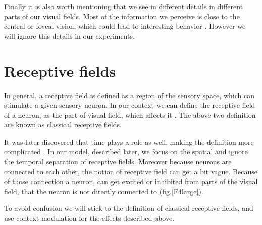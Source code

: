 Finally it is also worth mentioning that we see in different details in different parts of our visual fields. Most of the information we perceive is close to the central or foveal vision, which could lead to interesting behavior \cite{knight2008drastically}. However we will ignore this details in our experiments.


\section{Receptive fields}

In general, a receptive field is defined as a region of the sensory space, which can stimulate a given sensory neuron. In our context we can define the receptive field of a neuron, as the part of visual field, which affects it \cite{Hartline700}. The above two definition are known as classical receptive fields.

It was later discovered that time plays a role as well, making the definition more complicated \cite{deangelis1995receptive}. In our model, described later, we focus on the spatial and ignore the temporal separation of receptive fields. Moreover because neurons are connected to each other, the notion of receptive field can get a bit vague. Because of those connection a neuron, can get excited or inhibited from parts of the visual field, that the neuron is not directly connected to (fig.\ref{F4large}).

To avoid confusion we will stick to the definition of classical receptive fields, and use context modulation for the effects described above.


